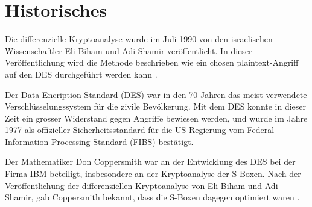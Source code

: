 \section{Historisches}\label{sec:Historisches}

Die differenzielle Kryptoanalyse wurde im Juli 1990 von den israelischen Wissenschaftler Eli Biham und Adi Shamir veröffentlicht. In dieser Veröffentlichung wird die Methode beschrieben wie ein \glqq chosen plaintext\grqq -Angriff auf den DES durchgeführt werden kann \cite{biham_differential_1990}.

Der Data Encription Standard (DES) war in den 70 Jahren das meist verwendete Verschlüsselungssystem für die zivile Bevölkerung. Mit dem DES konnte in dieser Zeit ein grosser Widerstand gegen Angriffe bewiesen werden, und wurde im Jahre 1977 als offizieller Sicherheitsstandard für die US-Regierung vom Federal Information Processing Standard (FIBS) bestätigt. 

Der Mathematiker Don Coppersmith war an der Entwicklung des DES bei der Firma IBM beteiligt, insbesondere an der Kryptoanalyse der S-Boxen. Nach der Veröffentlichung der differenziellen Kryptoanalyse von Eli Biham und Adi Shamir, gab Coppersmith bekannt, dass die S-Boxen dagegen optimiert waren \cite{d_coppersmith_data_1994}.




